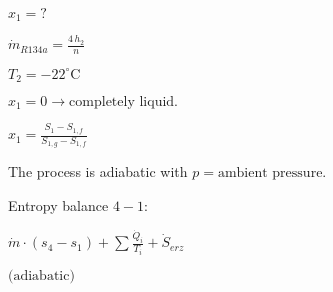 \( x_1 = ? \)  

\( \dot{m}_{R134a} = \frac{4 \, h_2}{n} \)  

\( T_2 = -22^\circ \text{C} \)  

\( x_1 = 0 \rightarrow \text{completely liquid.} \)  

\( x_1 = \frac{S_1 - S_{1,f}}{S_{1,g} - S_{1,f}} \)  

The process is adiabatic with \( p = \text{ambient pressure.} \)  

Entropy balance \( 4-1 \):  

\( \dot{m} \cdot (s_4 - s_1) + \sum \frac{\dot{Q}_i}{T_i} + \dot{S}_{erz} \)  

\( \text{(adiabatic)} \)